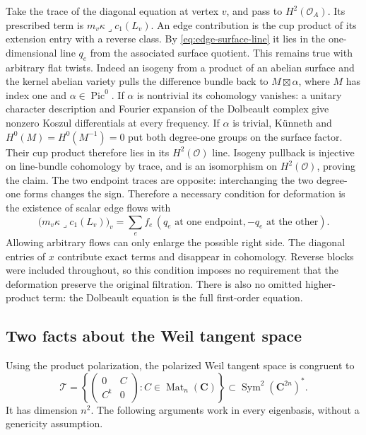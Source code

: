 \documentclass[11pt]{article}
\theoremstyle{definition}
\theoremstyle{remark}
\newcommand{\C}{\mathbf C}
\begin{document}
Take the trace of the diagonal equation at vertex $v$, and pass
to $H^2(\mathcal O_A)$.  Its prescribed term is
$m_v\kappa\lrcorner c_1(L_v)$.
An edge contribution is the cup product of its extension entry
with a reverse class.  By \eqref{eq:edge-surface-line} it lies in
the one-dimensional line $q_e$ from the associated surface quotient.
This remains true with arbitrary flat twists.  Indeed an isogeny
from a product of an abelian surface and the kernel abelian variety
pulls the difference bundle back to $M\boxtimes\alpha$, where
$M$ has index one and $\alpha\in\operatorname{Pic}^0$.
If $\alpha$ is nontrivial its cohomology vanishes: a unitary
character description and Fourier expansion of the Dolbeault
complex give nonzero Koszul differentials at every frequency.
If $\alpha$ is trivial, K\"unneth and $H^0(M)=H^0(M^{-1})=0$
put both degree-one groups on the surface factor.  Their cup
product therefore lies in its $H^2(\mathcal O)$ line.
Isogeny pullback is injective on line-bundle cohomology by trace,
and is an isomorphism on $H^2(\mathcal O)$, proving the claim.
The two endpoint traces are opposite: interchanging the two
degree-one forms changes the sign.
Therefore a necessary condition for deformation is the existence
of scalar edge flows with
\begin{equation}
 \bigl(m_v\kappa\lrcorner c_1(L_v)\bigr)_v
  =\sum_e f_e\,(q_e\text{ at one endpoint},
                         -q_e\text{ at the other}).
 \label{eq:tree-incidence}
\end{equation}
Allowing arbitrary flows can only enlarge the possible right side.
The diagonal entries of $x$ contribute exact terms and disappear
in cohomology.  Reverse blocks were included throughout, so this
condition imposes no requirement that the deformation preserve
the original filtration.  There is also no omitted higher-product
term: the Dolbeault equation is the full first-order equation.

\subsection{Two facts about the Weil tangent space}

Using the product polarization, the polarized Weil tangent space
is congruent to
\begin{equation}
 \mathcal T=
 \left\{\begin{pmatrix}0&C\\C^{\mathsf t}&0\end{pmatrix}:
                    C\in\operatorname{Mat}_n(\mathbf C)\right\}
 \subset\operatorname{Sym}^2(\mathbf C^{2n})^*.
 \label{eq:weil-offblock-tangent}
\end{equation}
It has dimension $n^2$.  The following arguments work in every
eigenbasis, without a genericity assumption.
\end{document}
